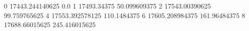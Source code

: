 0 17443.244140625 0.0
1 17493.34375 50.099609375
2 17543.00390625 99.759765625
4 17553.392578125 110.1484375
6 17605.208984375 161.96484375
8 17688.66015625 245.416015625
